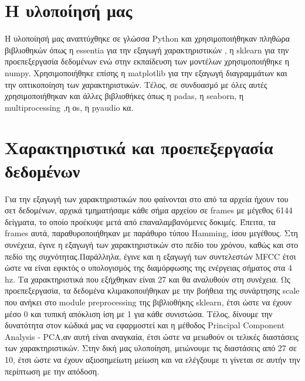 \section{Η υλοποίησή μας}

Η υλοποίησή μας αναπτύχθηκε σε γλώσσα Python και χρησιμοποιήθηκαν πληθώρα βιβλιοθηκών όπως η essentia για την εξαγωγή χαρακτηριστικών , η sklearn για την προεπεξεργασία δεδομένων
ενώ στην εκπαίδευση των μοντέλων χρησιμοποιήθηκε η numpy. Χρησιμοποιήθηκε επίσης η matplotlib για την εξαγωγή διαγραμμάτων και την οπτικοποίηση των χαρακτηριστικών. Τέλος, σε συνδυασμό με όλες αυτές χρησιμοποιήθηκαν και άλλες βιβλιοθήκες όπως η padas,  η seaborn, η multiprocessing ,η  οs, η pyaudio κα.


\section{Χαρακτηριστικά και προεπεξεργασία δεδομένων}

Για την εξαγωγή των χαρακτηριστικών που φαίνονται στο από τα αρχεία ήχουν του σετ δεδομένων, αρχικά τμηματήσαμε κάθε σήμα αρχείου σε frames με μέγεθος 6144 δείγματα, το οποίο προέκυψε μετά από επαναλαμβανόμενες δοκιμές.
 Έπειτα, τα frames αυτά, παραθυροποιήθηκαν με παράθυρο τύπου Hamming, ίσου μεγέθους. Στη συνέχεια, έγινε η εξαγωγή των χαρακτηριστικών στο πεδίο του χρόνου, καθώς και στο πεδίο της συχνότητας.Παράλληλα, έγινε και η εξαγωγή των συντελεστών MFCC έτσι ώστε να είναι εφικτός ο υπολογισμός της διαμόρφωσης της ενέργειας σήματος στα 4 hz. Τα χαρακτηριστικά που εξήχθηκαν είναι 27 και θα αναλυθούν στη συνέχεια. Ως προεπεξεργασία, τα δεδομένα κλιμακοποιήθηκαν με την βοήθεια  της συνάρτησης scale που ανήκει στο module preprocessing της βιβλιοθήκης sklearn, έτσι ώστε να έχουν μέσο 0 και τυπική απόκλιση ίση με 1 για κάθε συνιστώσα. Τέλος, δίνουμε την δυνατότητα στον κώδικά μας να εφαρμοστεί και η μέθοδος Principal Component Analysis - PCA,αν αυτή είναι αναγκαία, έτσι ώστε να μειωθούν οι τελικές διαστάσεις των χαρακτηριστικών. Στην δική μας υλοποίηση, μειώνουμε τις διαστάσεις από 27 σε 10, έτσι ώστε να έχουν αξιοσημείωτη μείωση και να ελέγξουμε τι γίνεται σε αυτήν την περίπτωση με την απόδοση.  


